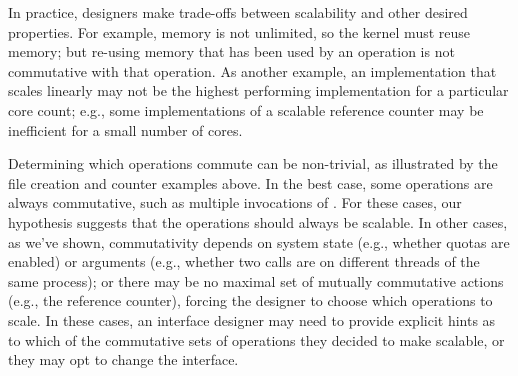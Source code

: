 \noindent
In practice, designers make trade-offs between scalability
and other desired properties.  For example, memory is not
unlimited, so the kernel must reuse memory; but re-using memory that has been used
by an operation is not commutative with that operation. As another example, an
implementation that scales linearly may not be the
highest performing implementation for a particular core count; e.g.,
some implementations of a scalable reference counter may be inefficient for a
small number of cores.

Determining which operations commute can be non-trivial, as illustrated
by the file creation and counter examples above.  In the best case,
some operations are always commutative, such as multiple invocations
of .  For these cases, our hypothesis suggests that
the operations should always be scalable.  In other cases, as we've
shown, commutativity depends on system state (e.g., whether quotas are
enabled) or arguments (e.g., whether two  calls are on different
threads of the same process); or there may be no maximal set of mutually
commutative actions (e.g., the reference counter), forcing the designer
to choose which operations to scale.
In these cases, an interface designer
may need to provide explicit hints as to which of the commutative sets
of operations they decided to make scalable, or they may opt to change
the interface.
